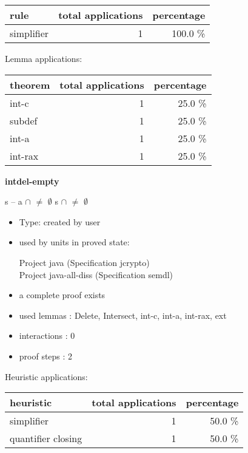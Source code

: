 \documentclass[a4paper]{article}
\begin{document}
\begin{supertabular}{l|r|r}
rule	        & total applications & percentage \\ \hline
simplifier & 1 & 100.0 \% \\

\end{supertabular}

Lemma applications:

\begin{supertabular}{l|r|r}
theorem	        & total applications & percentage \\ \hline
int-c & 1 & 25.0 \% \\
subdef & 1 & 25.0 \% \\
int-a & 1 & 25.0 \% \\
int-rax & 1 & 25.0 \% \\

\end{supertabular}
\pagebreak

{\LARGE\bf intdel-empty}\label{lemma-intdel-empty}

\medskip

 \Fol s -- a $\cap$  $\neq$ $\emptyset$ \Imp s $\cap$  $\neq$ $\emptyset$

\begin{itemize}

\item Type: created by user

\item used by units in proved state:

Project java (Specification jcrypto) \\
Project java-all-diss (Specification semdl)
\item       a complete proof exists
\item       used lemmas  : Delete, Intersect, int-c, int-a, int-rax, ext
\item       interactions : 0
\item       proof steps  : 2
\end{itemize}

\medskip


Heuristic applications:

\begin{supertabular}{l|r|r}
heuristic	& total applications & percentage \\ \hline
simplifier & 1 & 50.0 \% \\
quantifier closing & 1 & 50.0 \% \\

\end{supertabular}
\end{document}

